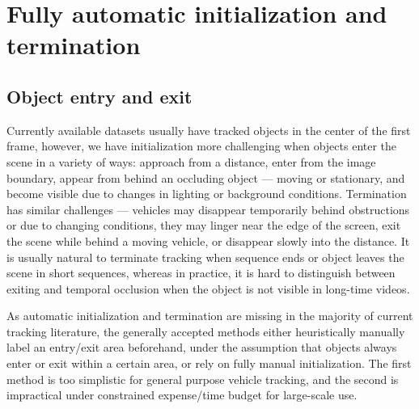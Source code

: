 \section{Fully automatic initialization and termination}
\label{sec:tracker-init-term}

\subsection{Object entry and exit} 
\label{subsec:tracker-entry-exit}

Currently available datasets usually have tracked objects in the center of the first frame, however, we have initialization more challenging when objects enter the scene in a variety of ways: approach from a distance, enter from the image boundary, appear from behind an occluding object --- moving or stationary, and become visible due to changes in lighting or background conditions. Termination has similar challenges --- vehicles may disappear temporarily behind obstructions or due to changing conditions, they may linger near the edge of the screen, exit the scene while behind a moving vehicle, or disappear slowly into the distance. It is usually natural to terminate tracking when sequence ends or object leaves the scene in short sequences, whereas in practice, it is hard to distinguish between exiting and temporal occlusion when the object is not visible in long-time videos.

As automatic initialization and termination are missing in the majority of current tracking literature, the generally accepted methods either heuristically manually label an entry/exit area beforehand, under the assumption that objects always enter or exit within a certain area, or rely on fully manual initialization. The first method is too simplistic for general purpose vehicle tracking, and the second is impractical under constrained expense/time budget for large-scale use.

